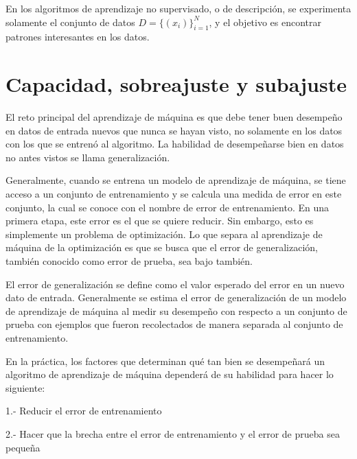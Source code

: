 \vspace{1em}

En los algoritmos de aprendizaje no supervisado, o de descripción, se experimenta solamente el conjunto de datos $D = \{(x_i)\}_{i=1}^N$, y el objetivo es encontrar patrones interesantes en los datos. \cite{Murphy:2012:MLP:2380985}

\section{Capacidad, sobreajuste y subajuste}
El reto principal del aprendizaje de máquina es que debe tener buen desempeño en datos de entrada nuevos que nunca se hayan visto, no solamente en los datos con los que se entrenó al algoritmo. La habilidad de desempeñarse bien en datos no antes vistos se llama generalización.


\vspace{1em}

Generalmente, cuando se entrena un modelo de aprendizaje de máquina, se tiene acceso a un conjunto de entrenamiento y se calcula una medida de error en este conjunto, la cual se conoce con el nombre de error de entrenamiento. En una primera etapa, este error es el que se quiere reducir. Sin embargo, esto es simplemente un problema de optimización. Lo que separa al aprendizaje de máquina de la optimización es que se busca que el error de generalización, también conocido como error de prueba, sea bajo también. \cite{goodfellow-et-al-2016}

\vspace{1em}

El error de generalización se define como el valor esperado del error en un nuevo dato de entrada. Generalmente se estima el error de generalización de un modelo de aprendizaje de máquina al medir su desempeño con respecto a un conjunto de prueba con ejemplos que fueron recolectados de manera separada al conjunto de entrenamiento. 

\vspace{1em}

En la práctica, los factores que determinan qué tan bien se desempeñará un algoritmo de aprendizaje de máquina dependerá de su habilidad para hacer lo siguiente:

1.- Reducir el error de entrenamiento

2.- Hacer que la brecha entre el error de entrenamiento y el error de prueba sea pequeña

\vspace{1em}

